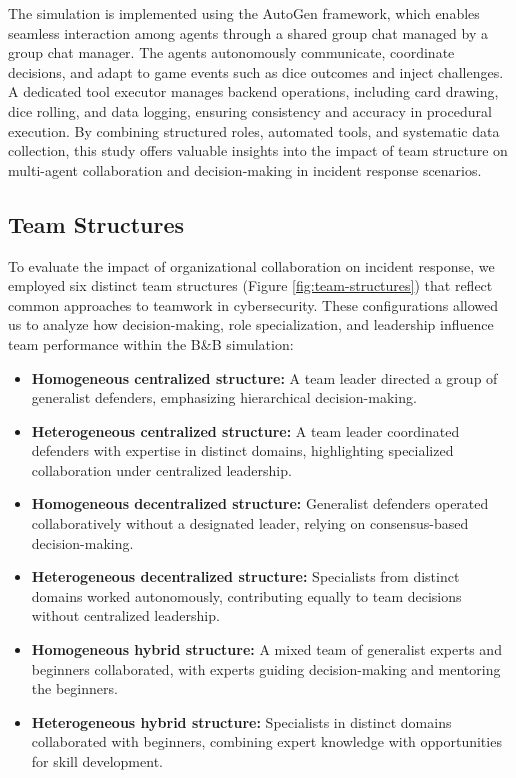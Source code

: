 \documentclass[letterpaper]{article} %
\begin{document}
The simulation is implemented using the AutoGen \cite{wu2023autogen} framework, which enables seamless interaction among agents through a shared group chat managed by a group chat manager. The agents autonomously communicate, coordinate decisions, and adapt to game events such as dice outcomes and inject challenges. A dedicated tool executor manages backend operations, including card drawing, dice rolling, and data logging, ensuring consistency and accuracy in procedural execution. By combining structured roles, automated tools, and systematic data collection, this study offers valuable insights into the impact of team structure on multi-agent collaboration and decision-making in incident response scenarios.

\subsection{Team Structures}

To evaluate the impact of organizational collaboration on incident response, we employed six distinct team structures (Figure \ref{fig:team-structures}) that reflect common approaches to teamwork in cybersecurity. These configurations allowed us to analyze how decision-making, role specialization, and leadership influence team performance within the B\&B simulation:

\begin{itemize}
    \item \textbf{Homogeneous centralized structure:} A team leader directed a group of generalist defenders, emphasizing hierarchical decision-making.
    
    \item \textbf{Heterogeneous centralized structure:} A team leader coordinated defenders with expertise in distinct domains, highlighting specialized collaboration under centralized leadership.
    
    \item \textbf{Homogeneous decentralized structure:} Generalist defenders operated collaboratively without a designated leader, relying on consensus-based decision-making. 
    
    \item \textbf{Heterogeneous decentralized structure:} Specialists from distinct domains worked autonomously, contributing equally to team decisions without centralized leadership.
    
    \item \textbf{Homogeneous hybrid structure:} A mixed team of generalist experts and beginners collaborated, with experts guiding decision-making and mentoring the beginners.
    
    \item \textbf{Heterogeneous hybrid structure:} Specialists in distinct domains collaborated with beginners, combining expert knowledge with opportunities for skill development.
\end{itemize}
\end{document}
